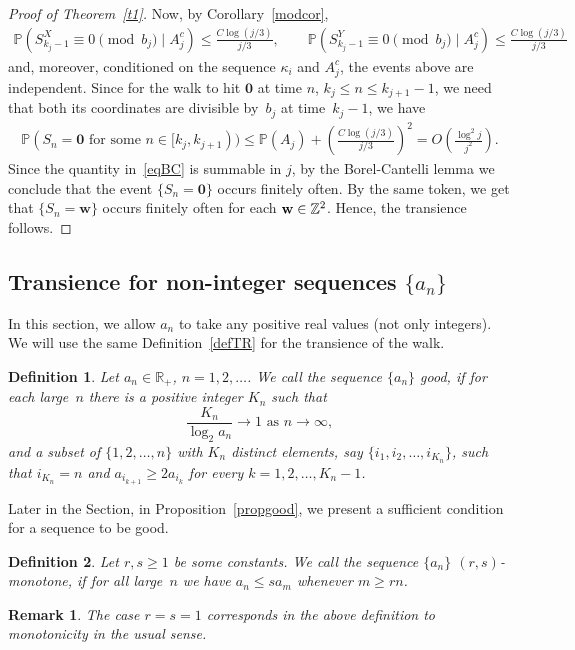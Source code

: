 \documentclass[12pt]{article}
\newtheorem{remark}{Remark}
\newtheorem{definition}{Definition}
\renewcommand\P{\mathbb{P}}
\newcommand\R{\mathbb{R}}
\newcommand\Z{\mathbb{Z}}
\begin{document}
\begin{proof}[Proof of Theorem~\ref{t1}]
Now, by Corollary~\ref{modcor},
\begin{align*}
\P(S^X_{k_j-1}\equiv 0\pmod {b_j} \mid A_j^c)\le \frac{C\log (j/3)}{j/3},\qquad
\P(S^Y_{k_j-1}\equiv 0\pmod {b_j} \mid A_j^c)\le \frac{C\log (j/3)}{j/3}
\end{align*}
and, moreover, conditioned on the sequence $\kappa_i$ and $A_j^c$, the events above are independent. Since for the walk to hit $\mathbf{0}$ at time $n$, $k_{j}\le n\le k_{j+1}-1$, we need that both its coordinates are divisible by~$b_j$ at time~$k_j-1$, we have
\begin{align}\label{eqBC}
\P(S_n=\mathbf{0}\text{ for some }n\in [k_j,k_{j+1}))
\le \P(A_j)+\left(\frac{C\log (j/3)}{j/3}\right)^2
=O\left(\frac{\log^2 j}{j^2}\right).
\end{align}
Since the quantity in~\eqref{eqBC} is summable in $j$, by the Borel-Cantelli lemma we conclude that the event $\{S_n=\mathbf{0}\}$ occurs finitely often. By the same token, we get that $\{S_n=\mathbf{w}\}$ occurs finitely often for each ${\bf w}\in \Z^2$. Hence, the transience follows.
\end{proof}





\subsection{Transience for non-integer sequences \texorpdfstring{$\{a_n\}$}{}}
In this section, we allow $a_n$ to take any positive real values (not only integers). We will use the same Definition~\ref{defTR} for the transience of the walk.

\begin{definition}
Let $a_n\in \R_+$,  $n=1,2,\dots$. We call the sequence $\{a_n\}$ {\em good}, if for each large~$n$ there is a positive integer $K_n$ such that
$$
\frac{K_n}{\log_2 a_n}\to 1\text{ as }n\to\infty,
$$
and a subset  of $\{1,2,\dots,n\}$  with $K_n$ distinct elements, say $\{ i_1,i_2,\dots,i_{K_n}\}$, such that $i_{K_n}= n$ and $a_{i_{k+1}}\ge 2a_{i_{k}}$ for every $k=1,2,\dots,K_n-1$.
\end{definition}

Later in the Section, in Proposition~\ref{propgood}, we present a sufficient condition for a sequence to be good.

\begin{definition}
Let $r,s\ge 1$ be some constants. We call the sequence $\{a_n\}$ {\em $(r,s)$-monotone}, if for all large~$n$  we have $a_n\le s a_m$ whenever $m\ge rn$.
\end{definition}
\begin{remark}
The case $r=s=1$ corresponds in the above definition to monotonicity in the usual sense.
\end{remark}
\end{document}
